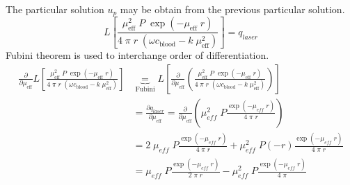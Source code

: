 \documentclass{article}         %
\theoremstyle{definition}
\theoremstyle{remark}
\begin{document}
The particular solution $u_p$ may be obtain from the previous particular
solution.
\[
  L \left[
    \frac{\mu_\text{eff}^2 \; P \; \exp \left(-\mu_\text{eff} \; r \right) }
         { 4 \; \pi \; r \; \left(\omega c_\text{blood}-k \; \mu_\text{eff}^2 \right)} 
    \right] =q_{laser} 
\]
Fubini theorem is used to interchange order of differentiation.
\[
\begin{split}
    \frac{\partial }{\partial \mu_\text{eff}}
  L \left[
    \frac{\mu_\text{eff}^2 \; P \; \exp \left(-\mu_\text{eff} \; r \right) }
         { 4 \; \pi \; r \; \left(\omega c_\text{blood}-k \; \mu_\text{eff}^2 \right)} 
    \right] 
  & \underbrace{
   = 
  }_\text{Fubini}
  L \left[
    \frac{\partial }{\partial \mu_\text{eff}}
   \left(
    \frac{\mu_\text{eff}^2 \; P \; \exp \left(-\mu_\text{eff} \; r \right) }
         { 4 \; \pi \; r \; \left(\omega c_\text{blood}-k \; \mu_\text{eff}^2 \right)} 
   \right)
   \right] 
\\
  &  =
    \frac{\partial q_{laser}}{\partial \mu_\text{eff}}
    = \frac{\partial }{\partial \mu_\text{eff}}
   \left(
    \mu_\textit{eff}^2 \;  P
    \frac{ \exp \left(-\mu_\textit{eff} \; r \right) }{ 4 \; \pi \; r}
   \right)
\\
 & = 
   2 \; \mu_\textit{eff} \;  P
    \frac{ \exp \left(-\mu_\textit{eff} \; r \right) }{ 4 \; \pi \; r}
   + 
    \mu_\textit{eff}^2 \;  P
    \left(-r\right) \frac{ \exp \left(-\mu_\textit{eff} \; r \right) }{ 4 \; \pi \; r}
 \\
 & = 
    \mu_\textit{eff} \;  P
    \frac{ \exp \left(-\mu_\textit{eff} \; r \right) }{ 2 \; \pi \; r}
   - 
    \mu_\textit{eff}^2 \;  P
                    \frac{ \exp \left(-\mu_\textit{eff} \; r \right) }{ 4 \; \pi }
\end{split}
\]
\end{document}
